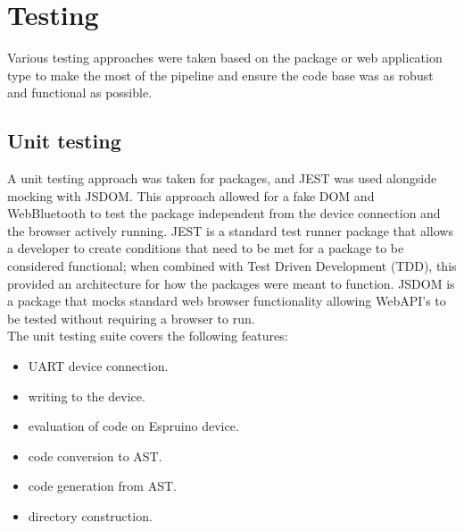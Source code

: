 \documentclass{l4proj}
\begin{document}
\section{Testing}
Various testing approaches were taken based on the package or web application type to make the most of the pipeline and ensure the code base was as robust and functional as possible.

\subsection{Unit testing}
A unit testing approach was taken for packages, and JEST was used alongside mocking with JSDOM. This approach allowed for a fake DOM and WebBluetooth to test the package independent from the device connection and the browser actively running. JEST is a standard test runner package that allows a developer to create conditions that need to be met for a package to be considered functional; when combined with Test Driven Development (TDD), this provided an architecture for how the packages were meant to function. JSDOM is a package that mocks standard web browser functionality allowing WebAPI's to be tested without requiring a browser to run.
\\
The unit testing suite covers the following features:
\begin{itemize}
    \item UART device connection.
    \item writing to the device.
    \item evaluation of code on Espruino device.
    \item code conversion to AST.
    \item code generation from AST.
    \item directory construction.

\end{itemize}
\end{document}
